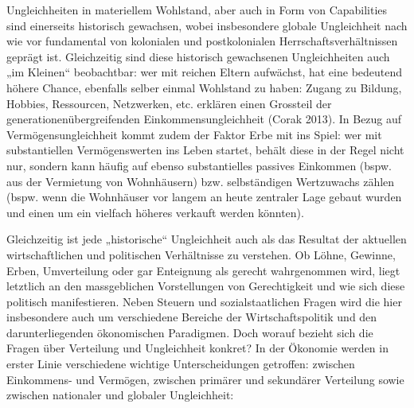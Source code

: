 \documentclass[
  nswissgerman,
  a4paper,
  DIV=11,
  numbers=noendperiod,
  oneside,
  openany]{scrreprt}
\begin{document}
Ungleichheiten in materiellem Wohlstand, aber auch in Form von
Capabilities sind einerseits historisch gewachsen, wobei insbesondere
globale Ungleichheit nach wie vor fundamental von kolonialen und
postkolonialen Herrschaftsverhältnissen geprägt ist. Gleichzeitig sind
diese historisch gewachsenen Ungleichheiten auch „im Kleinen``
beobachtbar: wer mit reichen Eltern aufwächst, hat eine bedeutend höhere
Chance, ebenfalls selber einmal Wohlstand zu haben: Zugang zu Bildung,
Hobbies, Ressourcen, Netzwerken, etc. erklären einen Grossteil der
generationenübergreifenden Einkommensungleichheit (Corak 2013). In Bezug
auf Vermögensungleichheit kommt zudem der Faktor Erbe mit ins Spiel: wer
mit substantiellen Vermögenswerten ins Leben startet, behält diese in
der Regel nicht nur, sondern kann häufig auf ebenso substantielles
passives Einkommen (bspw. aus der Vermietung von Wohnhäusern) bzw.
selbständigen Wertzuwachs zählen (bspw. wenn die Wohnhäuser vor langem
an heute zentraler Lage gebaut wurden und einen um ein vielfach höheres
verkauft werden könnten).

Gleichzeitig ist jede „historische`` Ungleichheit auch als das Resultat
der aktuellen wirtschaftlichen und politischen Verhältnisse zu
verstehen. Ob Löhne, Gewinne, Erben, Umverteilung oder gar Enteignung
als gerecht wahrgenommen wird, liegt letztlich an den massgeblichen
Vorstellungen von Gerechtigkeit und wie sich diese politisch
manifestieren. Neben Steuern und sozialstaatlichen Fragen wird die hier
insbesondere auch um verschiedene Bereiche der Wirtschaftspolitik und
den darunterliegenden ökonomischen Paradigmen. Doch worauf bezieht sich
die Fragen über Verteilung und Ungleichheit konkret? In der Ökonomie
werden in erster Linie verschiedene wichtige Unterscheidungen getroffen:
zwischen Einkommens- und Vermögen, zwischen primärer und sekundärer
Verteilung sowie zwischen nationaler und globaler Ungleichheit:
\end{document}
